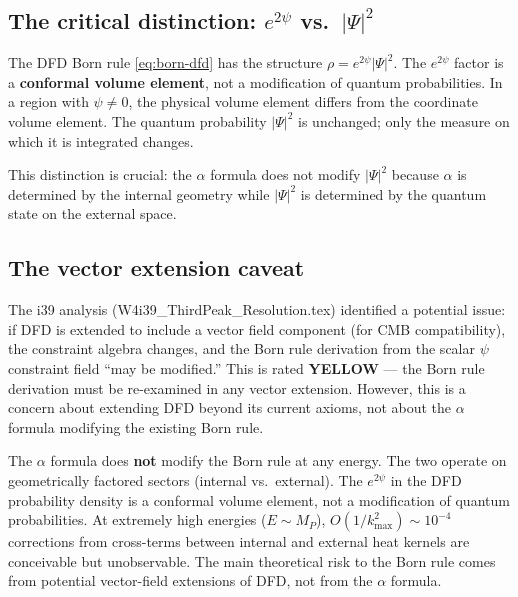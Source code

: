 \documentclass[12pt,a4paper]{article}
\begin{document}
\subsection{The critical distinction: $e^{2\psi}$ vs.\ $|\Psi|^2$}

The DFD Born rule \eqref{eq:born-dfd} has the structure $\rho = e^{2\psi}|\Psi|^2$. The $e^{2\psi}$ factor is a \textbf{conformal volume element}, not a modification of quantum probabilities. In a region with $\psi \neq 0$, the physical volume element differs from the coordinate volume element. The quantum probability $|\Psi|^2$ is unchanged; only the measure on which it is integrated changes.

This distinction is crucial: the $\alpha$ formula does not modify $|\Psi|^2$ because $\alpha$ is determined by the internal geometry while $|\Psi|^2$ is determined by the quantum state on the external space.

\subsection{The vector extension caveat}

The i39 analysis (W4i39\_ThirdPeak\_Resolution.tex) identified a potential issue: if DFD is extended to include a vector field component (for CMB compatibility), the constraint algebra changes, and the Born rule derivation from the scalar $\psi$ constraint field ``may be modified.'' This is rated \textcolor{dfdred}{\textbf{YELLOW}} --- the Born rule derivation must be re-examined in any vector extension. However, this is a concern about extending DFD beyond its current axioms, not about the $\alpha$ formula modifying the existing Born rule.

\begin{tcolorbox}[colback=blue!5!white, colframe=blue!60!black, title=Answer to Question 5]
The $\alpha$ formula does \textbf{not} modify the Born rule at any energy. The two operate on geometrically factored sectors (internal vs.\ external). The $e^{2\psi}$ in the DFD probability density is a conformal volume element, not a modification of quantum probabilities. At extremely high energies ($E \sim M_P$), $O(1/k_{\max}^2) \sim 10^{-4}$ corrections from cross-terms between internal and external heat kernels are conceivable but unobservable. The main theoretical risk to the Born rule comes from potential vector-field extensions of DFD, not from the $\alpha$ formula.
\end{tcolorbox}


\end{document}
